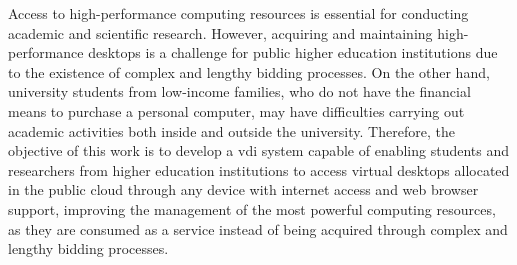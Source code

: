 
\begin{abstractutfpr} %

Access to high-performance computing resources is essential for conducting academic and scientific research. However, acquiring and maintaining high-performance \glspl{desktop} is a challenge for public higher education institutions due to the existence of complex and lengthy bidding processes. On the other hand, university students from low-income families, who do not have the financial means to purchase a personal computer, may have difficulties carrying out academic activities both inside and outside the university. Therefore, the objective of this work is to develop a \gls{vdi} system capable of enabling students and researchers from higher education institutions to access virtual \glspl{desktop} allocated in the public cloud through any device with internet access and web browser support, improving the management of the most powerful computing resources, as they are consumed as a service instead of being acquired through complex and lengthy bidding processes.

\end{abstractutfpr}